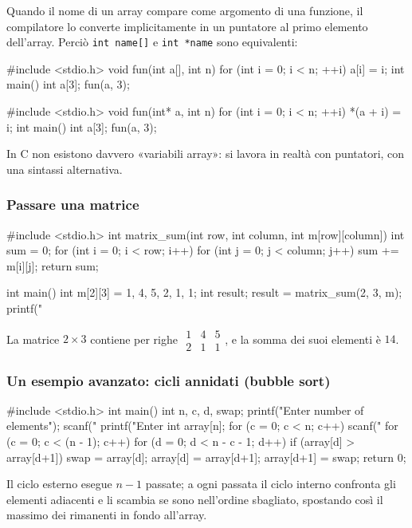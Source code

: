 \documentclass[11pt,a4paper]{article}
\begin{document}
Quando il nome di un array compare come argomento di una funzione, il compilatore lo converte implicitamente in un puntatore al primo elemento dell'array. Perciò \lstinline|int name[]| e \lstinline|int *name| sono equivalenti:
\begin{codice}
#include <stdio.h>
void fun(int a[], int n) {
    for (int i = 0; i < n; ++i)
        a[i] = i;
}
int main() {
    int a[3];
    fun(a, 3);
}
\end{codice}
\begin{codice}
#include <stdio.h>
void fun(int* a, int n) {
    for (int i = 0; i < n; ++i)
        *(a + i) = i;
}
int main() {
    int a[3];
    fun(a, 3);
}
\end{codice}
In C non esistono davvero «variabili array»: si lavora in realtà con puntatori, con una sintassi alternativa.

\subsubsection{Passare una matrice}

\begin{codice}
#include <stdio.h>
int matrix_sum(int row, int column, int m[row][column]) {
    int sum = 0;
    for (int i = 0; i < row; i++)
        for (int j = 0; j < column; j++)
            sum += m[i][j];
    return sum;
}

int main() {
    int m[2][3] = {1, 4, 5, 2, 1, 1};
    int result;
    result = matrix_sum(2, 3, m);
    printf("%
}
\end{codice}
La matrice $2\times 3$ contiene per righe $\begin{smallmatrix}1&4&5\\2&1&1\end{smallmatrix}$, e la somma dei suoi elementi è $14$.

\subsubsection{Un esempio avanzato: cicli annidati (bubble sort)}

\begin{codice}
#include <stdio.h>
int main() {
    int n, c, d, swap;
    printf("Enter number of elements\n");
    scanf("%
    printf("Enter %
    int array[n];
    for (c = 0; c < n; c++)
        scanf("%
    for (c = 0; c < (n - 1); c++)
    {
        for (d = 0; d < n - c - 1; d++)
        {
            if (array[d] > array[d+1])
            {
                swap       = array[d];
                array[d]   = array[d+1];
                array[d+1] = swap;
            }
        }
    }
    return 0;
}
\end{codice}
Il ciclo esterno esegue $n - 1$ passate; a ogni passata il ciclo interno confronta gli elementi adiacenti e li scambia se sono nell'ordine sbagliato, spostando così il massimo dei rimanenti in fondo all'array.
\end{document}
